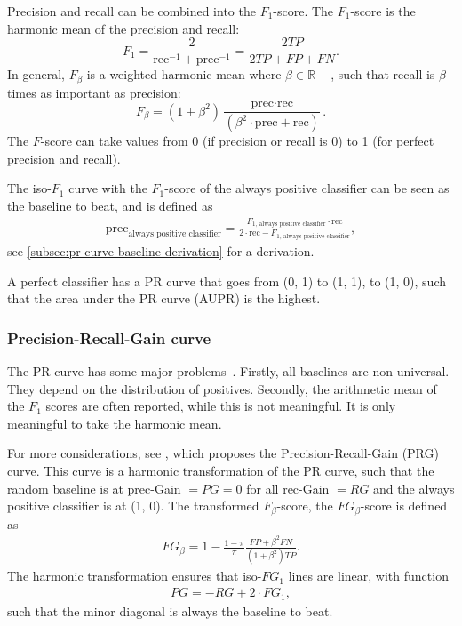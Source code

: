 Precision and recall can be combined into the $F_1$-score.
The $F_1$-score is the harmonic mean of the precision and recall:
\begin{equation}
    F_1 = \frac{2}{\text{rec}^{-1} + \text{prec}^{-1}} = \frac{2 TP}{2 TP + FP + FN}.
\end{equation}
In general, $F_\beta$ is a weighted harmonic mean where $\beta\in\mathbb{R}+$, such that recall is $\beta$ times as important as precision:
\begin{equation}
    F_\beta = (1+\beta^2)\frac{\text{prec}\cdot\text{rec}}{(\beta^2\cdot\text{prec}+\text{rec})}.
\end{equation} 
The $F$-score can take values from 0 (if precision or recall is 0) to 1 (for perfect precision and recall).

The iso-$F_1$ curve with the $F_1$-score of the always positive classifier can be seen as the baseline to beat, and is defined as
\begin{align}
    \mathrm{prec}_\text{always positive classifier} = \frac{F_{1,\,\text{always positive classifier}} \cdot \mathrm{rec}}{2\cdot\mathrm{rec} - F_{1,\,\text{always positive classifier}}},
\end{align}
see \cref{subsec:pr-curve-baseline-derivation} for a derivation.

A perfect classifier has a PR curve that goes from (0, 1) to (1, 1), to (1, 0), such that the area under the PR curve (AUPR) is the highest.

\subsubsection{Precision-Recall-Gain curve}
The PR curve has some major problems~.
Firstly, all baselines are non-universal.
They depend on the distribution of positives.
Secondly, the arithmetic mean of the $F_1$ scores are often reported, while this is not meaningful.
It is only meaningful to take the harmonic mean.

For more considerations, see \citeauthor{Flach2015} , which proposes the Precision-Recall-Gain (PRG) curve.
This curve is a harmonic transformation of the PR curve, such that the random baseline is at $\mathrm{prec}$-Gain $ = PG = 0$ for all $\mathrm{rec}$-Gain $ = RG$ and the always positive classifier is at (1, 0).
The transformed $F_\beta$-score, the $FG_\beta$-score is defined as
\begin{align}
    FG_\beta = 1 - \frac{1 - \pi}{\pi}\frac{FP + \beta^2 FN}{(1+\beta^2)TP}.
\end{align}
The harmonic transformation ensures that iso-$FG_1$ lines are linear, with function
\begin{align}
    PG = -RG + 2 \cdot FG_1,
\end{align}
such that the minor diagonal is always the baseline to beat.

